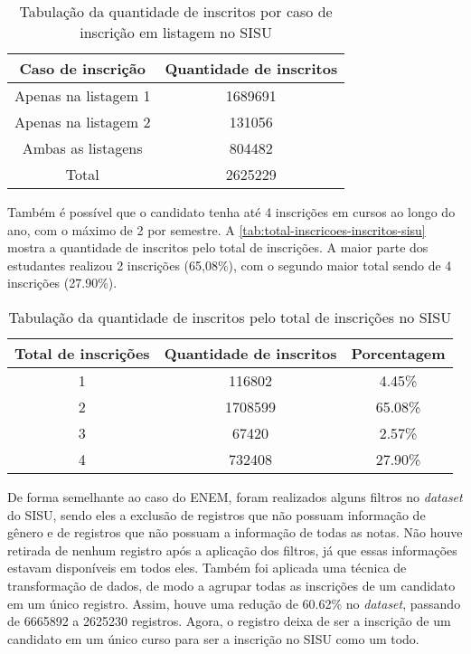 \begin{table}[h]
  \begin{tabular}{cc}
  \hline
  \multicolumn{1}{c}{\textbf{Caso de inscrição}}        & \textbf{Quantidade de inscritos} \\ \hline
  Apenas na listagem 1  & 1689691                          \\ \hline
  Apenas na listagem 2  & 131056                           \\ \hline
  Ambas as listagens & 804482                           \\ \hline
  \multicolumn{1}{c}{Total}                & 2625229                          \\ \hline
  \end{tabular}
  \caption{Tabulação da quantidade de inscritos por caso de inscrição em listagem no SISU}
  \label{tab:caso-inscricao-sisu}
  \end{table}

Também é possível que o candidato tenha até 4 inscrições em cursos ao longo do ano, com o máximo de 2 por semestre. A \autoref{tab:total-inscricoes-inscritos-sisu} mostra a quantidade de inscritos pelo total de inscrições. A maior parte dos estudantes realizou 2 inscrições (65,08\%), com o segundo maior total sendo de 4 inscrições (27.90\%). 

\begin{table}[h]
  \begin{tabular}{ccc}
  \hline
  \textbf{Total de inscrições} & \textbf{Quantidade de inscritos} & \textbf{Porcentagem} \\ \hline
  1                            & 116802                           & 4.45\%               \\ \hline
  2                            & 1708599                          & 65.08\%              \\ \hline
  3                            & 67420                            & 2.57\%               \\ \hline
  4                            & 732408                           & 27.90\%              \\ \hline
  \end{tabular}
  \caption{Tabulação da quantidade de inscritos pelo total de inscrições no SISU}
  \label{tab:total-inscricoes-inscritos-sisu}
  \end{table}

De forma semelhante ao caso do ENEM, foram realizados alguns filtros no \textit{dataset} do SISU, sendo eles a exclusão de registros que não possuam informação de gênero e de registros que não possuam a informação de todas as notas. Não houve retirada de nenhum registro após a aplicação dos filtros, já que essas informações estavam disponíveis em todos eles. Também foi aplicada uma técnica de transformação de dados, de modo a agrupar todas as inscrições de um candidato em um único registro. Assim, houve uma redução de 60.62\% no \textit{dataset}, passando de 6665892 a 2625230 registros. Agora, o registro deixa de ser a inscrição de um candidato em um único curso para ser a inscrição no SISU como um todo.

